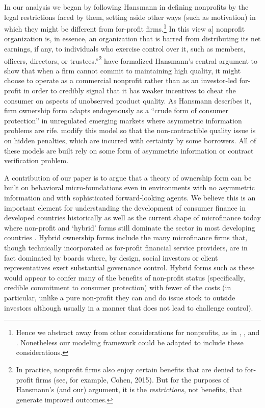\documentclass[11pt,english]{article}
\theoremstyle{plain}
\theoremstyle{definition}
\begin{document}
In our analysis we began by following Hansmann in defining nonprofits
by the legal restrictions faced by them, setting aside other ways
(such as motivation) in which they might be different from for-profit
firms.\footnote{Hence we abstract away from other considerations for nonprofits, as
in \citet{besley2005}, \citet{mcintosh2005}, and \citet{guha2013}.
Nonetheless our modeling framework could be adapted to include these
considerations.} In this view \textquotedbl{}{[}a{]} nonprofit organization is, in
essence, an organization that is barred from distributing its net
earnings, if any, to individuals who exercise control over it, such
as members, officers, directors, or trustees.\textquotedblright \footnote{In practice, nonprofit firms also enjoy certain benefits that are
denied to for-profit firms (see, for example, Cohen, 2015). But for
the purposes of Hansmann's (and our) argument, it is the \textit{restrictions},
not benefits, that generate improved outcomes.} \citet{glaeser2001} have formalized Hansmann's central argument
to show that when a firm cannot commit to maintaining high quality,
it might choose to operate as a commercial nonprofit rather than as
an investor-led for-profit in order to credibly signal that it has
weaker incentives to cheat the consumer on aspects of unobserved product
quality. As Hansmann describes it, firm ownership form adapts endogenously
as a ``crude form of consumer protection'' in unregulated emerging
markets where asymmetric information problems are rife. \citet{bubb2013}
modify this model so that the non-contractible quality issue is on
hidden penalties, which are incurred with certainty by some borrowers.
All of these models are built rely on some form of asymmetric information
or contract verification problem.

A contribution of our paper is to argue that a theory of ownership
form can be built on behavioral micro-foundations even in environments
with no asymmetric information and with sophisticated forward-looking
agents. We believe this is an important element for understanding
the development of consumer finance in developed countries historically
as well as the current shape of microfinance today where non-profit
and `hybrid' forms still dominate the sector in most developing countries
\citep{cull2009,conning2011}. Hybrid ownership forms include the
many microfinance firms that, though technically incorporated as for-profit
financial service providers, are in fact dominated by boards where,
by design, social investors or client representatives exert substantial
governance control. Hybrid forms such as these would appear to confer
many of the benefits of non-profit status (specifically, credible
commitment to consumer protection) with fewer of the costs (in particular,
unlike a pure non-profit they can and do issue stock to outside investors
although usually in a manner that does not lead to challenge control).
\end{document}
